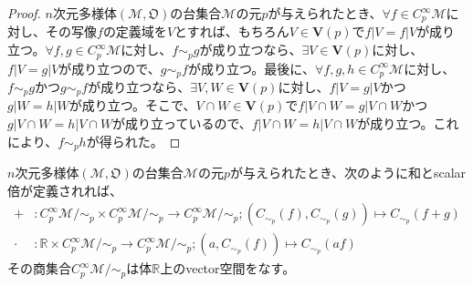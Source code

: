 \documentclass[dvipdfmx]{jsarticle}
\begin{document}
\begin{proof}
  $n$次元多様体$\left(\mathcal{M},\mathfrak{O}\right)$の台集合$\mathcal{M}$の元$p$が与えられたとき、$\forall f\in C^\infty_p \mathcal{M}$に対し、その写像$f$の定義域を$V$とすれば、もちろん$V\in \mathbf{V}\left(p\right)$で$f|V=f|V$が成り立つ。$\forall f,g\in C^\infty_p \mathcal{M}$に対し、$f\sim_p g$が成り立つなら、$\exists V\in \mathbf{V}\left(p\right)$に対し、$f|V=g|V$が成り立つので、$g\sim_p f$が成り立つ。最後に、$\forall f,g,h\in C^\infty_p \mathcal{M}$に対し、$f\sim_p g$かつ$g\sim_p f$が成り立つなら、$\exists V,W\in \mathbf{V}\left(p\right)$に対し、$f|V=g|V$かつ$g|W=h|W$が成り立つ。そこで、$V\cap W\in \mathbf{V}\left(p\right)$で$f|V\cap W=g|V\cap W$かつ$g|V\cap W=h|V\cap W$が成り立っているので、$f|V\cap W=h|V\cap W$が成り立つ。これにより、$f\sim_p h$が得られた。
\end{proof}
\begin{thm}\label{8.3.3.4}
  $n$次元多様体$\left(\mathcal{M},\mathfrak{O}\right)$の台集合$\mathcal{M}$の元$p$が与えられたとき、次のように和とscalar倍が定義されれば、
  \begin{align*}
    +&:C^\infty_p \mathcal{M} /\sim_p \times C^\infty_p \mathcal{M} /\sim_p \rightarrow C^\infty_p \mathcal{M} /\sim_p ; \left( C_{\sim_p} \left(f\right),C_{\sim_p} \left(g\right)\right) \mapsto C_{\sim_p} \left(f+g\right) \\
    \cdot &: \mathbb{R} \times C^\infty_p \mathcal{M} /\sim_p \rightarrow C^\infty_p \mathcal{M} /\sim_p ; \left( a,C_{\sim_p } \left(f\right) \right) \mapsto C_{\sim_p} \left(af\right)
  \end{align*}
  その商集合$C^\infty_p \mathcal{M} /\sim_p $は体$\mathbb{R}$上のvector空間をなす。
\end{thm}
\end{document}
